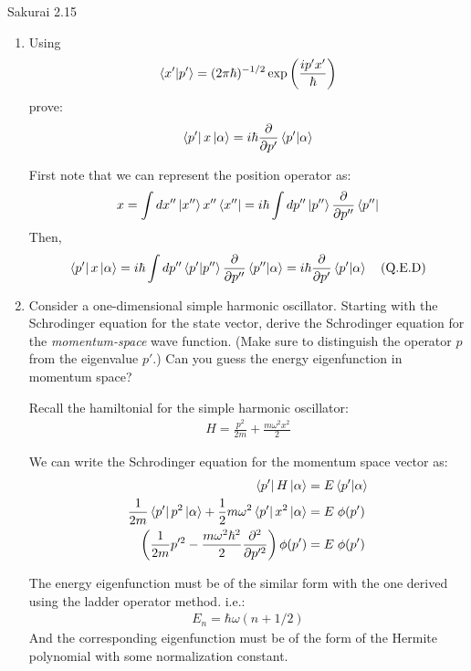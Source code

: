 \documentclass{article}
\begin{document}
\newpage
\begin{section}{Sakurai 2.15}
\begin{enumerate}
	\item Using
	$$
		\bra{x'}\ket{p'} = (2\pi\hbar)^{-1/2} \exp \left( \frac{i p' x'}{\hbar} \right)
	$$
	prove:
	$$
		\bra{p'}x\ket{\alpha} = i \hbar \frac{\partial}{\partial p'} \bra{p'}\ket{\alpha}
	$$

	\begin{tcolorbox}
		First note that we can represent the position operator as:
		\begin{align*}
			x = \int dx'' \ket{x''} x'' \bra{x''} = i \hbar \int dp'' \ket{p''} \frac{\partial}{\partial p''} \bra{p''}
		\end{align*}
		Then,
		\begin{align*}
			\bra{p'}x\ket{\alpha}  = i \hbar \int dp'' \bra{p'}\ket{p''} \frac{\partial}{\partial p''} \bra{p''} \ket{\alpha} = i \hbar \frac{\partial}{\partial p'} \bra{p'}\ket{\alpha} \quad \text{(Q.E.D)}
		\end{align*}
	\end{tcolorbox}

	\item Consider a one-dimensional simple harmonic oscillator. Starting with the Schrodinger equation for the state vector, derive the Schrodinger equation for the \textit{momentum-space} wave function. (Make sure to distinguish the operator $p$ from the eigenvalue $p'$.) Can you guess the energy eigenfunction in momentum space?

	\begin{tcolorbox}
		Recall the hamiltonial for the simple harmonic oscillator:
		\begin{align*}
			H = \frac{p^2}{2m} + \frac{m\omega^2 x^2}{2}
		\end{align*}

		We can write the Schrodinger equation for the momentum space vector as:
		\begin{align*}
			\bra{p'}H\ket{\alpha}                                                                                   & = E \bra{p'}\ket{\alpha} \\
			\frac{1}{2m} \bra{p'}p^2\ket{\alpha} + \frac{1}{2} m\omega^2 \bra{p'}x^2\ket{\alpha}                    & = E \; \phi(p')          \\
			\left( \frac{1}{2m} p'^2 - \frac{m\omega^2\hbar^2}{2} \frac{\partial^2}{\partial p'^2} \right) \phi(p') & = E \; \phi(p')          \\
		\end{align*}

		The energy eigenfunction must be of the similar form with the one derived using the ladder operator method. i.e.:
		\begin{align*}
			E_n = \hbar \omega (n+1/2)
		\end{align*}
		And the corresponding eigenfunction must be of the form of the Hermite polynomial with some normalization constant.
	\end{tcolorbox}
\end{enumerate}
\end{section}
\end{document}
